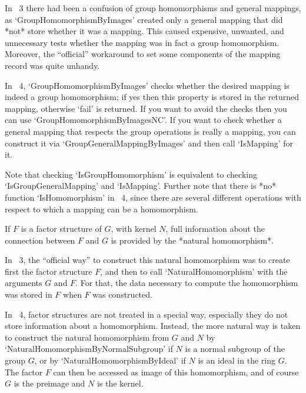 
In {\GAP}~3 there had been a confusion of group homomorphisms and general
mappings,
as `GroupHomomorphismByImages' created only a general mapping that did
*not* store whether it was a mapping.
This caused expensive, unwanted, and unnecessary tests whether the
mapping was in fact a group homomorphism.
Moreover, the ``official'' workaround to set some components of the
mapping record was quite unhandy.

In {\GAP}~4, `GroupHomomorphismByImages' checks whether the desired
mapping is indeed a group homomorphism; if yes then this property is
stored in the returned mapping, otherwise `fail' is returned.
If you want to avoid the checks then you can use
`GroupHomomorphismByImagesNC'.
If you want to check whether a general mapping that respects the group
operations is really a mapping, you can construct it via
`GroupGeneralMappingByImages' and then call `IsMapping' for it.

Note that checking `IsGroupHomomorphism' is equivalent to checking
`IsGroupGeneralMapping' and `IsMapping'.
Further note that there is *no* function `IsHomomorphism' in {\GAP}~4,
since there are several different operations with respect to which a
mapping can be a homomorphism.



If $F$ is a factor structure of $G$, with kernel $N$,
full information about the connection between $F$ and $G$ is provided by
the *natural homomorphism*.

In {\GAP}~3, the ``official way'' to construct this natural homomorphism
was to create first the factor structure $F$, and then to call
`NaturalHomomorphism' with the arguments $G$ and $F$.
For that, the data necessary to compute the homomorphism was stored in
$F$ when $F$ was constructed.

In {\GAP}~4, factor structures are not treated in a special way,
especially they do not store information about a homomorphism.
Instead, the more natural way is taken to construct the natural
homomorphism from $G$ and $N$ by `NaturalHomomorphismByNormalSubgroup'
if $N$ is a normal subgroup of the group $G$,
or by `NaturalHomomorphismByIdeal' if $N$ is an ideal in the ring $G$.
The factor $F$ can then be accessed as image of this homomorphism,
and of course $G$ is the preimage and $N$ is the kernel.

